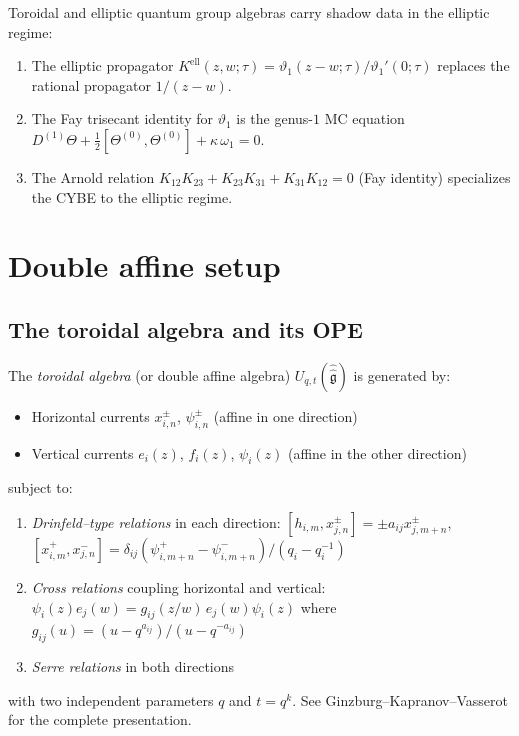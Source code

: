 \begin{construction}
\label{constr:elliptic-shadow-data}
Toroidal and elliptic quantum group algebras carry shadow data in the elliptic regime:
\begin{enumerate}[label=\textup{(\roman*)}]
\item The elliptic propagator $K^{\mathrm{ell}}(z,w;\tau) = \vartheta_1(z-w;\tau)/\vartheta_1'(0;\tau)$ replaces the rational propagator $1/(z-w)$.
\item The Fay trisecant identity for $\vartheta_1$ is the genus-$1$ MC equation $D^{(1)}\Theta + \tfrac{1}{2}[\Theta^{(0)}, \Theta^{(0)}] + \kappa\,\omega_1 = 0$.
\item The Arnold relation $K_{12}K_{23} + K_{23}K_{31} + K_{31}K_{12} = 0$ (Fay identity) specializes the CYBE to the elliptic regime.
\end{enumerate}
\end{construction}

\section{Double affine setup}
\label{sec:double-affine}

\subsection{The toroidal algebra and its OPE}

\begin{definition}\label{def:toroidal}
The \emph{toroidal algebra} (or double affine algebra) $U_{q,t}(\hat{\hat{\mathfrak{g}}})$ 
is generated by:
\begin{itemize}
\item Horizontal currents $x^\pm_{i,n}$, $\psi^\pm_{i,n}$ (affine in one direction)
\item Vertical currents $e_i(z)$, $f_i(z)$, $\psi_i(z)$ (affine in the other direction)
\end{itemize}
subject to:
\begin{enumerate}
\item \emph{Drinfeld--type relations} in each direction:
$[h_{i,m}, x^\pm_{j,n}] = \pm a_{ij} x^\pm_{j,m+n}$, \quad
$[x^+_{i,m}, x^-_{j,n}] = \delta_{ij} (\psi^+_{i,m+n} - \psi^-_{i,m+n})/(q_i - q_i^{-1})$
\item \emph{Cross relations} coupling horizontal and vertical:
$\psi_i(z) e_j(w) = g_{ij}(z/w) \, e_j(w) \psi_i(z)$
where $g_{ij}(u) = (u - q^{a_{ij}})/(u - q^{-a_{ij}})$
\item \emph{Serre relations} in both directions
\end{enumerate}
with two independent parameters $q$ and $t = q^k$. See Ginzburg--Kapranov--Vasserot
for the complete presentation.
\end{definition}

